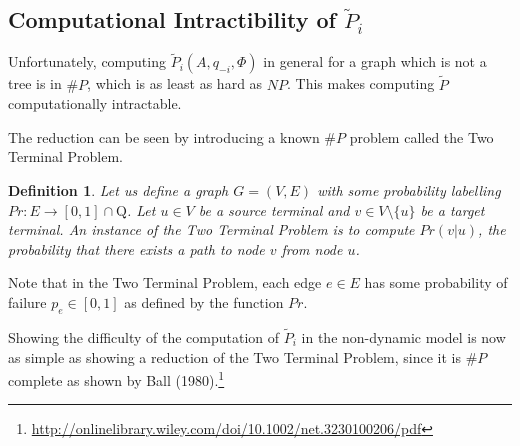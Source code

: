 \documentclass{article}
\theoremstyle{plain}
\newtheorem{definition}{Definition}
\begin{document}
\subsection{Computational Intractibility of $\tilde{P}_i$}

Unfortunately, computing $\tilde{P}_i(A, q_{-i}, \Phi)$ in general for a graph which is not a tree is in $\# P$, which is as least as hard as $NP$. This makes computing $\tilde{P}$ computationally intractable.

The reduction can be seen by introducing a known $\# P$ problem called the Two Terminal Problem.

\begin{definition}
  Let us define a graph $G = (V, E)$ with some probability labelling $Pr: E \to [0,1] \cap \mathrm{Q}$. Let $u \in V$ be a source terminal and $v \in V \setminus \{u\}$ be a target terminal. An instance of the \emph{Two Terminal Problem} is to compute $Pr(v | u)$, the probability that there exists a path to node $v$ from node $u$.
\end{definition}

Note that in the Two Terminal Problem, each edge $e \in E$ has some probability of failure $p_e \in [0,1]$ as defined by the function $Pr$.

Showing the difficulty of the computation of $\tilde{P}_i$ in the non-dynamic model is now as simple as showing a reduction of the Two Terminal Problem, since it is $\# P$ complete as shown by Ball (1980).\footnote{\url{http://onlinelibrary.wiley.com/doi/10.1002/net.3230100206/pdf}}
\end{document}
